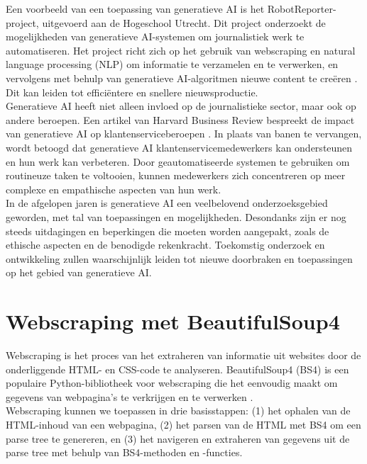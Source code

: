Een voorbeeld van een toepassing van generatieve AI is het RobotReporter-project, uitgevoerd aan de Hogeschool Utrecht. Dit project onderzoekt de mogelijkheden van generatieve AI-systemen om journalistiek werk te automatiseren. Het project richt zich op het gebruik van webscraping en natural language processing (NLP) om informatie te verzamelen en te verwerken, en vervolgens met behulp van generatieve AI-algoritmen nieuwe content te creëren \autocite{HU2021}. Dit kan leiden tot efficiëntere en snellere nieuwsproductie. \\

Generatieve AI heeft niet alleen invloed op de journalistieke sector, maar ook op andere beroepen. Een artikel van Harvard Business Review bespreekt de impact van generatieve AI op klantenserviceberoepen \autocite{HBR2023}. In plaats van banen te vervangen, wordt betoogd dat generatieve AI klantenservicemedewerkers kan ondersteunen en hun werk kan verbeteren. Door geautomatiseerde systemen te gebruiken om routineuze taken te voltooien, kunnen medewerkers zich concentreren op meer complexe en empathische aspecten van hun werk. \\

In de afgelopen jaren is generatieve AI een veelbelovend onderzoeksgebied geworden, met tal van toepassingen en mogelijkheden. Desondanks zijn er nog steeds uitdagingen en beperkingen die moeten worden aangepakt, zoals de ethische aspecten en de benodigde rekenkracht. Toekomstig onderzoek en ontwikkeling zullen waarschijnlijk leiden tot nieuwe doorbraken en toepassingen op het gebied van generatieve AI. \\

\section{Webscraping met BeautifulSoup4}

Webscraping is het proces van het extraheren van informatie uit websites door de onderliggende HTML- en CSS-code te analyseren. BeautifulSoup4 (BS4) is een populaire Python-bibliotheek voor webscraping die het eenvoudig maakt om gegevens van webpagina's te verkrijgen en te verwerken \autocite{BIO2014, BSFOR2015}. \\

 Webscraping kunnen we toepassen in drie basisstappen: (1) het ophalen van de HTML-inhoud van een webpagina, (2) het parsen van de HTML met BS4 om een parse tree te genereren, en (3) het navigeren en extraheren van gegevens uit de parse tree met behulp van BS4-methoden en -functies.  \autocite{BIO2014} \\

